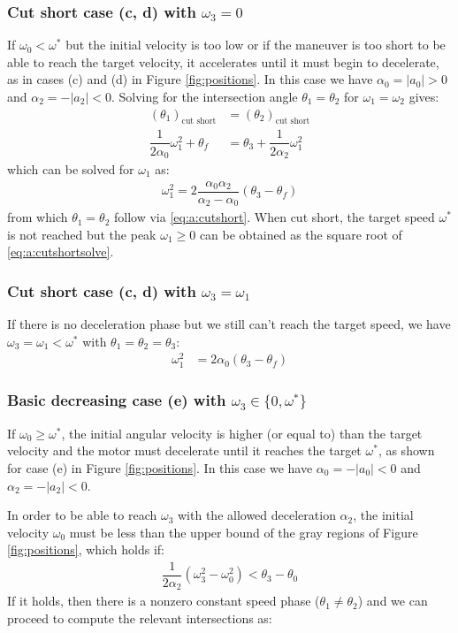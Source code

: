 \documentclass[12pt, a4paper]
{article}
\providecommand{\lr}[1]{\left(#1\right)}
\providecommand{\sub}[1]{_{\text{#1}}}
\providecommand{\w}{\omega}
\providecommand{\wt}{\w^*}
\renewcommand{\th}{\theta}
\renewcommand{\a}{\alpha}
\providecommand{\abs}[1]{\left|#1\right|}
\begin{document}
\subsubsection{Cut short case (c, d) with $\w_3 = 0$}
\label{sec:a:cutshortw3is0}
If $\w_0 < \wt$ but the initial velocity is too low or if the
maneuver is too short to be able to reach the target velocity, it accelerates
until it must begin to decelerate, as in cases (c) and (d) in
Figure \ref{fig:positions}.
In this case we have $\a_0 = \abs{a_0} > 0$ and $\a_2 = -\abs{a_2} < 0$.
Solving for the intersection angle $\th_1=\th_2$ for $\w_1=\w_2$ gives:
%
\begin{align}
    \label{eq:a:cutshort}
    \lr{\th_1}\sub{cut short} &= \lr{\th_2}\sub{cut short}\\[1em]
    \dfrac{1}{2\a_0}\w_1^2 + \th_f  &= \th_3 + \dfrac{1}{2\a_2} \w_1^2 
\end{align}
%
which can be solved for $\w_1$ as:
%
\begin{align}
    \label{eq:a:cutshortsolve}
    \w_1^2 = 2 \dfrac{\a_0\a_2}{\a_2-\a_0}\lr{\th_3 - \th_f}
\end{align}
%
from which $\th_1=\th_2$ follow via \eqref{eq:a:cutshort}.
%
When cut short, the target speed $\wt$ is not reached but the
peak $\w_1 \geq 0$ can be obtained as the square root
of \eqref{eq:a:cutshortsolve}.
%
\subsubsection{Cut short case (c, d) with $\w_3 = \w_1$}
\label{sec:a:cutshortw3isw1}

If there is no deceleration phase but we still can't reach the target speed,
we have $\w_3=\w_1 < \wt$ with $\th_1=\th_2=\th_3$:
%
\begin{align}
    \label{eq:a:cutshortw1}
    \w_1^2  &= 2\a_0\lr{\th_3 - \th_f}
\end{align}

\subsubsection{Basic decreasing case (e)  with $\w_3 \in \{0, \wt\}$}
\label{sec:a:decreasing}
If $\w_0 \geq \wt$, the initial angular velocity is higher (or equal to) than
the target velocity and the motor must decelerate until it reaches the target
$\wt$, as shown for case (e) in Figure \ref{fig:positions}.
In this case we have $\a_0 = -\abs{a_0} < 0$ and $\a_2 = -\abs{a_2} < 0$.

In order to be able to reach $\w_3$ with the allowed deceleration $\a_2$,
the initial velocity $\w_0$ must be less than the upper bound of the
gray regions of Figure \ref{fig:positions}, which holds if:
%
\begin{align}
    \label{eq:a:decreaselimit}
     \dfrac{1}{2 \a_2}\lr{\w_3^2 - \w_0^2} < \th_3 - \th_0
\end{align}
%
If it holds, then there is a nonzero constant speed phase ($\th_1 \neq \th_2$)
and we can proceed to compute the relevant intersections as: 
\end{document}
